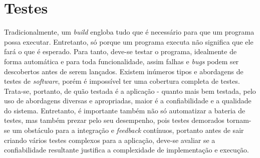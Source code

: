 


\section{Testes}

Tradicionalmente, um \emph{build} engloba tudo que é necessário para que um programa possa executar. Entretanto, só porque um programa executa não significa que ele fará o que é esperado. Para tanto, deve-se testar o programa, idealmente de forma automática e para toda funcionalidade, assim falhas e \emph{bugs} podem ser descobertos antes de serem lançados. Existem inúmeros tipos e abordagens de testes de \emph{software}, porém é impossível ter uma cobertura completa de testes. Trata-se, portanto, de quão testada é a aplicação - quanto mais bem testada, pelo uso de abordagens diversas e apropriadas, maior é a confiabilidade e a qualidade do sistema. Entretanto, é importante também não só automatizar a bateria de testes, mas também prezar pelo seu desempenho, pois testes demorados tornam-se um obstáculo para a integração e \emph{feedback} contínuos, portanto antes de sair criando vários testes complexos para a aplicação, deve-se avaliar se a confiabilidade resultante justifica a complexidade de implementação e execução. \cite{martin-fowler-continuous-integration,livro-building-microservices}


